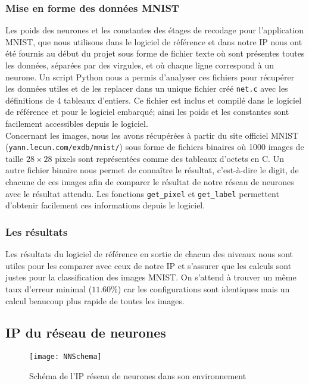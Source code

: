 \subsubsection{Mise en forme des données MNIST}

Les poids des neurones et les constantes des étages de recodage
pour l'application MNIST, que nous utilisons dans
le logiciel de référence et dans notre IP nous ont été fournis au début du projet
sous forme de fichier texte où sont présentes toutes les données, séparées par
des virgules, et où chaque ligne correspond à un neurone. Un script Python nous
a permis d'analyser ces fichiers pour récupérer les données utiles et de les
replacer dans un unique fichier créé \texttt{net.c} avec les définitions de
4 tableaux d'entiers. Ce fichier est inclus et compilé dans le logiciel de référence et
pour le logiciel embarqué; ainsi les poids et les constantes sont
facilement accessibles depuis le logiciel. \\
Concernant les images, nous les avons récupérées à partir du site
officiel MNIST \linebreak (\texttt{yann.lecun.com/exdb/mnist/}) sous forme de fichiers
binaires où 1000 images de taille $28 \times 28$ pixels sont représentées comme
des tableaux d'octets en C. Un autre fichier binaire nous permet de connaître
le résultat, c'est-à-dire le digit, de chacune de ces images afin de comparer le
résultat de notre réseau de neurones avec le résultat attendu.
Les fonctions \texttt{get\_pixel} et \texttt{get\_label} permettent d'obtenir
facilement ces informations depuis le logiciel.

\subsubsection{Les résultats}

Les résultats du logiciel de référence en sortie de chacun des niveaux nous
sont utiles pour les comparer avec ceux de notre IP et s'assurer que les calculs
sont justes pour la classification des images MNIST. On s'attend à trouver
un même taux d'erreur minimal ($11.60\%$) car les configurations sont identiques
mais un calcul beaucoup plus rapide de toutes les images.

\subsection{IP du réseau de neurones}

\begin{figure}[h!]
    \begin{center}
    	\texttt{[image: NNSchema]}
    	\label{fig:NNSchema}
    	\caption{Schéma de l'IP réseau de neurones dans son environnement }
    \end{center}
\end{figure}

